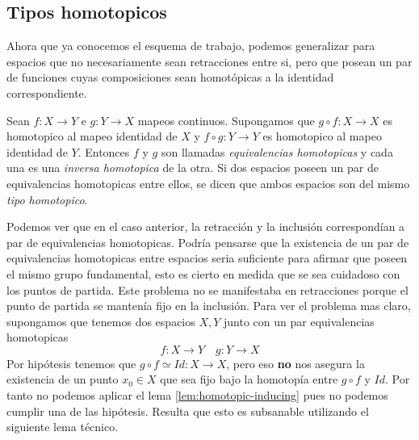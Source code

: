 \subsection{Tipos homotopicos}
Ahora que ya conocemos el esquema de trabajo, podemos generalizar para
espacios que no necesariamente sean retracciones entre si, pero que
posean un par de funciones cuyas composiciones sean homotópicas a la
identidad correspondiente.
\begin{definicion}
  Sean \(f : X \to Y\) e \(g : Y \to X\) mapeos continuos. Supongamos
  que \( g \circ f : X \to X \) es homotopico al mapeo identidad de
  \(X\) y \( f \circ g : Y \to Y \) es homotopico al mapeo identidad de
  \(Y\). Entonces \(f\) y \(g\) son llamadas \emph{equivalencias
  homotopicas} y cada una es una \emph{inversa homotopica} de la otra.
  Si dos espacios poseen un par de equivalencias homotopicas entre ellos,
  se dicen que ambos espacios son del mismo \emph{tipo homotopico}.
\end{definicion}
Podemos ver que en el caso anterior, la retracción y la inclusión
correspondían a par de equivalencias homotopicas. Podría pensarse que la
existencia de un par de equivalencias homotopicas entre espacios seria
suficiente para afirmar que poseen el mismo grupo fundamental, esto es
cierto en medida que se sea cuidadoso con los puntos de partida. Este
problema no se manifestaba en retracciones porque el punto de partida se
mantenía fijo en la inclusión. Para ver el problema mas claro,
supongamos que tenemos dos espacios \(X, Y\) junto con un par
equivalencias homotopicas
\[ f : X \to Y \quad g : Y \to X \]
Por hipótesis tenemos que \(g \circ f \simeq Id : X \to X\), pero eso
\textbf{no} nos asegura la existencia de un punto \(x_0 \in X\) que sea
fijo bajo la homotopía entre \( g \circ f\) y \(Id\). Por tanto no
podemos aplicar el lema \ref{lem:homotopic-inducing} pues no podemos
cumplir una de las hipótesis. Resulta que esto es subsanable utilizando
el siguiente lema técnico.

